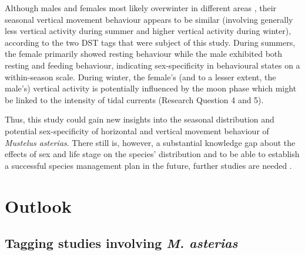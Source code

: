 \documentclass[
  authoryear,
  review,
  3p]{elsarticle}
\begin{document}
Although males and females most likely overwinter in different areas
\citep{breve_2016, griffiths_2020}, their seasonal vertical movement
behaviour appears to be similar (involving generally less vertical
activity during summer and higher vertical activity during winter),
according to the two DST tags that were subject of this study. During
summers, the female primarily showed resting behaviour while the male
exhibited both resting and feeding behaviour, indicating sex-specificity
in behavioural states on a within-season scale. During winter, the
female's (and to a lesser extent, the male's) vertical activity is
potentially influenced by the moon phase which might be linked to the
intensity of tidal currents (Research Question 4 and 5).

Thus, this study could gain new insights into the seasonal distribution
and potential sex-specificity of horizontal and vertical movement
behaviour of \emph{Mustelus asterias}. There still is, however, a
substantial knowledge gap about the effects of sex and life stage on the
species' distribution \citep{griffiths_2020} and to be able to establish
a successful species management plan in the future, further studies are
needed
\citep{mccullyphillips_2015, breve_2016, breve_2020, griffiths_2020}.

\hypertarget{outlook}{%
\section{Outlook}\label{outlook}}

\hypertarget{tagging-studies-involving-m.-asterias}{%
\subsection{\texorpdfstring{Tagging studies involving \emph{M.
asterias}}{Tagging studies involving M. asterias}}\label{tagging-studies-involving-m.-asterias}}
\end{document}
